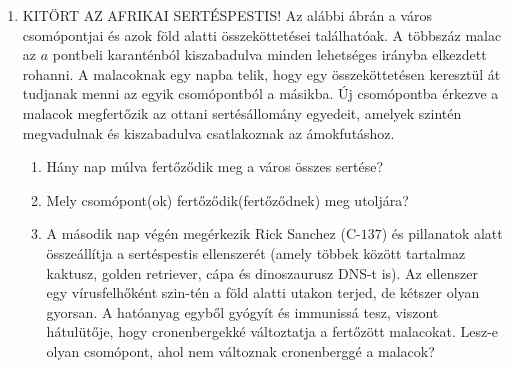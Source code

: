 \documentclass[a4paper,12pt]{article}
\begin{document}
\begin{enumerate}
        \item KITÖRT AZ AFRIKAI SERTÉSPESTIS! Az alábbi ábrán a város csomópontjai és azok föld alatti összeköttetései találhatóak. A többszáz malac az $a$ pontbeli karanténból kiszabadulva minden lehetséges irányba elkezdett rohanni. A malacoknak egy napba telik, hogy egy összeköttetésen keresztül át tudjanak menni az egyik csomópontból a másikba. Új csomópontba érkezve a malacok megfertőzik az ottani sertésállomány egyedeit, amelyek szintén megvadulnak és kiszabadulva csatlakoznak az ámokfutáshoz.
        
        \begin{minipage}{0.6\textwidth}
            \begin{enumerate}
                \item Hány nap múlva fertőződik meg a város összes sertése?
                \item Mely csomópont(ok) fertőződik(fertőződnek) meg utoljára?
                \item A második nap végén megérkezik Rick Sanchez (C-$137$) és pillanatok alatt összeállítja a sertéspestis ellenszerét (amely többek között tartalmaz kaktusz, golden retriever, cápa és dinoszaurusz DNS-t is). Az ellenszer egy vírusfelhőként szin-tén a föld alatti utakon terjed, de kétszer olyan gyorsan. A hatóanyag egyből gyógyít és immunissá tesz, viszont hátulütője, hogy cronenbergekké változtatja a fertőzött malacokat. Lesz-e olyan csomópont, ahol nem változnak cronenberggé a malacok?
            \end{enumerate}
        \end{minipage}
        \begin{minipage}{0.3\textwidth}
            \centering
            
        \end{minipage}



\end{enumerate}
\end{document}
